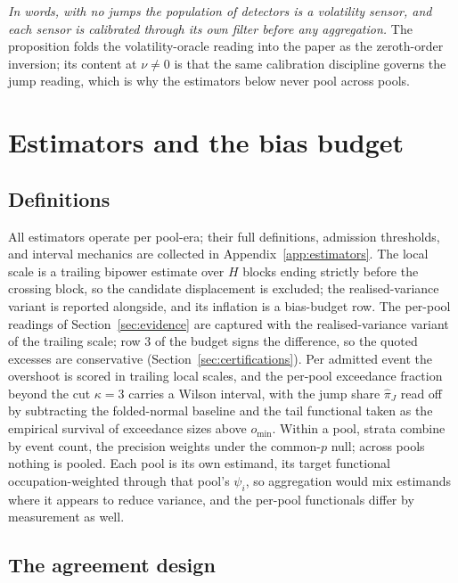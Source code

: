 \documentclass[11pt,a4paper]{article}
\theoremstyle{definition}
\theoremstyle{plain}
\theoremstyle{remark}
\begin{document}
\emph{In words, with no jumps the population of detectors is a volatility sensor, and each sensor is calibrated through its own filter before any aggregation.} The proposition folds the
volatility-oracle reading into the paper as the zeroth-order inversion; its content at $\nu \ne 0$ is that the same calibration discipline governs the jump reading, which is why the estimators 
below never pool across pools.

\section{Estimators and the bias budget}\label{sec:estimators}

\subsection{Definitions}\label{sec:defs}

All estimators operate per pool-era; their full definitions, admission thresholds, and interval mechanics are collected in Appendix~\ref{app:estimators}. The local scale is a trailing 
bipower estimate over $H$ blocks ending strictly before the crossing block, so the candidate displacement is excluded; the realised-variance variant is reported alongside, and its inflation 
is a bias-budget row. The per-pool readings of Section~\ref{sec:evidence} are captured with the realised-variance variant of the trailing scale; row 3 of the budget signs the difference, 
so the quoted excesses are conservative (Section~\ref{sec:certifications}). Per admitted event the overshoot is scored in trailing local scales, and the per-pool exceedance fraction beyond 
the cut $\kappa = 3$ carries a Wilson interval,\cite{wilson1927} with the jump share $\hat\pi_J$ read off by subtracting the folded-normal baseline and the tail functional taken as the 
empirical survival of exceedance sizes above $o_{\min}$. Within a pool, strata combine by event count, the precision weights under the common-$p$ null; across pools nothing is pooled. 
Each pool is its own estimand, its target functional occupation-weighted through that pool's $\psi_i$, so aggregation would mix estimands where it appears to reduce variance, and the per-pool 
functionals differ by measurement as well.

\subsection{The agreement design}\label{sec:agreement}
\end{document}
